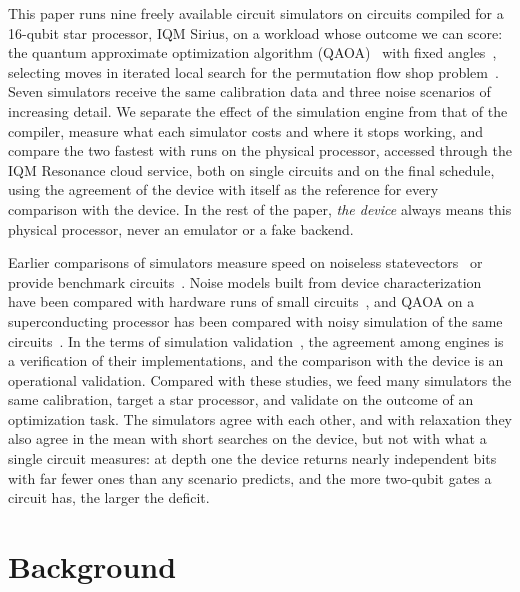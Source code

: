 \documentclass{scspaperproc}
\begin{document}
This paper runs nine freely available circuit simulators on circuits compiled
for a 16-qubit star processor, IQM Sirius, on a workload whose outcome we can
score: the quantum approximate optimization algorithm
(QAOA)~\cite{farhi2014qaoa} with fixed angles~\cite{wurtz2021fixed}, selecting moves in iterated
local search for the permutation flow shop
problem~\cite{anon2026a,anon2026b,anon2026c}. Seven simulators receive the same
calibration data and three noise scenarios of increasing detail. We separate
the effect of the simulation engine from that of the compiler, measure what
each simulator costs and where it stops working, and compare the two fastest
with runs on the physical processor, accessed through the IQM Resonance cloud
service, both on single circuits and on the final schedule, using the
agreement of the device with itself as the reference for every comparison
with the device. In the rest of the paper, \emph{the device} always means this
physical processor, never an emulator or a fake backend.

Earlier comparisons of simulators measure speed on noiseless
statevectors~\cite{jamadagni2024bench} or provide benchmark
circuits~\cite{li2023qasmbench}. Noise models built from device
characterization have been compared with hardware runs of small
circuits~\cite{georgopoulos2021noise,dahlhauser2021noisy}, and QAOA on a
superconducting processor has been compared with noisy simulation of the same
circuits~\cite{harrigan2021qaoa}. In the terms of simulation
validation~\cite{sargent2013vv}, the agreement among engines is a
verification of their implementations, and the comparison with the device is
an operational validation. Compared with these studies, we feed many
simulators the same calibration, target a star processor, and validate on the
outcome of an optimization task. The simulators agree with each other, and
with relaxation they also agree in the mean with short searches on the
device, but not with what a single circuit measures: at depth one the device returns nearly independent bits
with far fewer ones than any scenario predicts, and the more two-qubit gates a
circuit has, the larger the deficit.

\section{Background}
\end{document}
